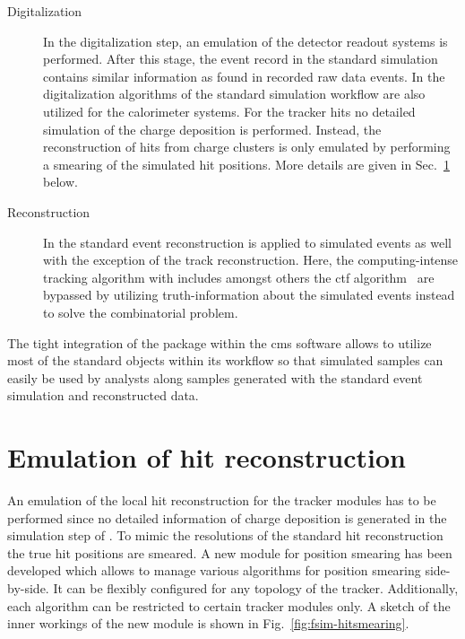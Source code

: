 \begin{description}
\item[Digitalization] In the digitalization step, an emulation of the detector readout systems is performed. After this stage, the event record in the standard simulation contains similar information as found in recorded raw data events. In \FSIM the digitalization algorithms of the standard simulation workflow are also utilized for the calorimeter systems. For the tracker hits no detailed simulation of the charge deposition is performed. Instead, the reconstruction of hits from charge clusters is only emulated by performing a smearing of the simulated hit positions. More details are given in Sec.~\ref{sec:fsim-hits} below.

\item[Reconstruction] In \FSIM the standard event reconstruction is applied to simulated events as well with the exception of the track reconstruction. Here, the computing-intense tracking algorithm with includes amongst others the \acrfull{ctf} algorithm~\cite{Chatrchyan:2014fea} are bypassed by utilizing truth-information about the simulated events instead to solve the combinatorial problem.
\end{description}

The tight integration of the \FSIM package within the \gls{cms} software allows to utilize most of the standard objects within its workflow so that simulated \FSIM samples can easily be used by analysts along samples generated with the standard event simulation and reconstructed data. 


\section{Emulation of hit reconstruction}
\label{sec:fsim-hits}

An emulation of the local hit reconstruction for the tracker modules has to be performed since no detailed information of charge deposition is generated in the simulation step of \FSIM. To mimic the resolutions of the standard hit reconstruction the true hit positions are smeared. A new \FSIM module for position smearing has been developed which allows to manage various algorithms for position smearing side-by-side. It can be flexibly configured for any topology of the tracker. Additionally, each algorithm can be restricted to certain tracker modules only. A sketch of the inner workings of the new module is shown in Fig.~\ref{fig:fsim-hitsmearing}.

